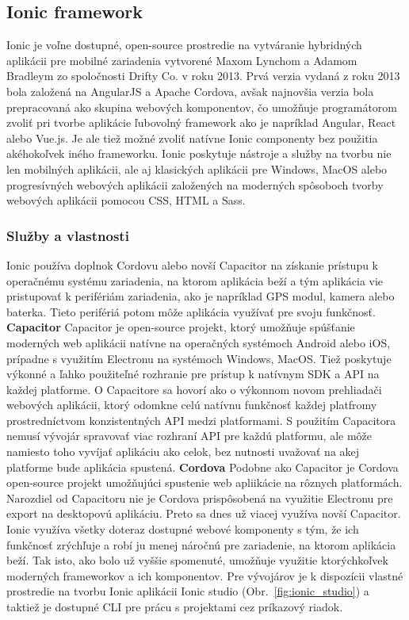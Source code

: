 \subsection{Ionic framework}
\indent Ionic je voľne dostupné, open-source prostredie na vytváranie hybridných aplikácii pre mobilné zariadenia vytvorené Maxom Lynchom a Adamom Bradleym zo spoločnosti Drifty Co. v roku 2013. Prvá verzia vydaná z roku 2013 bola založená na AngularJS a Apache Cordova, avšak najnovšia verzia bola prepracovaná ako skupina webových komponentov, čo umožňuje programátorom zvoliť pri tvorbe aplikácie ľubovolný framework ako je napríklad Angular, React alebo Vue.js. Je ale tiež možné zvoliť natívne Ionic componenty bez použitia akéhokoľvek iného frameworku. Ionic poskytuje nástroje a služby na tvorbu nie len mobilných aplikácii, ale aj klasických aplikácii pre Windows, MacOS alebo progresívných webových aplikácii založených na moderných spôsoboch tvorby webových aplikácii pomocou CSS, HTML a Sass.

\subsubsection{Služby a vlastnosti}
\indent Ionic používa doplnok Cordovu alebo novší Capacitor na získanie prístupu k operačnému systému zariadenia, na ktorom aplikácia beží a tým aplikácia vie pristupovať k perifériám zariadenia, ako je napríklad GPS modul, kamera alebo baterka. Tieto perifériá potom môže aplikácia využívať pre svoju funkčnosť. \newline
\textbf{Capacitor}\newline
\indent Capacitor je open-source projekt, ktorý umožňuje spúšťanie moderných web aplikácii natívne na operačných systémoch Android alebo iOS, prípadne s využitím Electronu na systémoch Windows, MacOS. Tiež poskytuje výkonné a ľahko použiteľné rozhranie pre prístup k natívnym SDK a API na každej platforme. O Capacitore sa hovorí ako o výkonnom novom prehliadači webových aplikácii, ktorý odomkne celú natívnu funkčnosť každej platfromy prostredníctvom konzistentných API medzi platformami. S použitím Capacitora nemusí vývojár spravovať viac rozhraní API pre každú platformu, ale môže namiesto toho vyvíjať aplikáciu ako celok, bez nutnosti uvažovať na akej platforme bude aplikácia spustená. \newline
\textbf{Cordova}\newline
\indent Podobne ako Capacitor je Cordova open-source projekt umožňujúci spustenie web apliikácie na rôznych platformách. Narozdiel od Capacitoru nie je Cordova prispôsobená na využitie Electronu pre export na desktopovú aplikáciu. Preto sa dnes už viacej využíva novší Capacitor.
\indent Ionic využíva všetky doteraz dostupné webové komponenty s tým, že ich funkčnosť zrýchľuje a robí ju menej náročnú pre zariadenie, na ktorom aplikácia beží. Tak isto, ako bolo už vyššie spomenuté, umožňuje využitie ktorýchkoľvek moderných frameworkov a ich komponentov. Pre vývojárov je k dispozícii vlastné prostredie na tvorbu Ionic aplikácii Ionic studio (Obr.~\ref{fig:ionic_studio}) a taktiež je dostupné CLI pre prácu s projektami cez príkazový riadok. 

